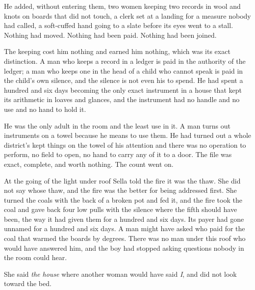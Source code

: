 He added, without entering them, two women keeping two records in wool and knots on boards that did not touch, a clerk set at a landing for a measure nobody had called, a soft-cuffed hand going to a slate before its eyes went to a stall. Nothing had moved. Nothing had been paid. Nothing had been joined.

The keeping cost him nothing and earned him nothing, which was its exact distinction. A man who keeps a record in a ledger is paid in the authority of the ledger; a man who keeps one in the head of a child who cannot speak is paid in the child's own silence, and the silence is not even his to spend. He had spent a hundred and six days becoming the only exact instrument in a house that kept its arithmetic in loaves and glances, and the instrument had no handle and no use and no hand to hold it.

He was the only adult in the room and the least use in it. A man turns out instruments on a towel because he means to use them. He had turned out a whole district's kept things on the towel of his attention and there was no operation to perform, no field to open, no hand to carry any of it to a door. The file was exact, complete, and worth nothing. The count went on.

\scenebreak

At the going of the light under  roof Sella told the fire it was the thaw. She did not say whose thaw, and the fire was the better for being addressed first. She turned the coals with the back of a broken pot and fed it, and the fire took the coal and gave back four low pulls with the silence where the fifth should have been, the way it had given them for a hundred and six days. Its payer had gone unnamed for a hundred and six days. A man might have asked who paid for the coal that warmed the boards by degrees. There was no man under this roof who would have answered him, and the boy had stopped asking questions nobody in the room could hear.

She said \emph{the house} where another woman would have said \emph{I}, and did not look toward the bed.

